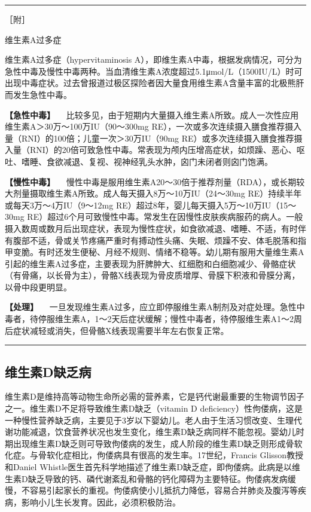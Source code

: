 \begin{center}\rule{0.5\linewidth}{\linethickness}\end{center}

［附］

维生素A过多症

维生素A过多症（hypervitaminosis
A），即维生素A中毒，根据发病情况，可分为急性中毒及慢性中毒两种。当血清维生素A浓度超过5.1μmol/L（1500IU/L）时可出现中毒症状。过去曾报道过极区探险者因大量食用维生素A含量丰富的北极熊肝而发生急性中毒。

\textbf{【急性中毒】}
　比较多见，由于短期内大量摄入维生素A所致。成人一次性应用维生素A＞30万～100万IU（90～300mg
RE），一次或多次连续摄入膳食推荐摄入量（RNI）的100倍；儿童一次＞30万IU（90mg
RE）或多次连续摄入膳食推荐摄入量（RNI）的20倍可致急性中毒。常表现为颅内压增高症状，如烦躁、恶心、呕吐、嗜睡、食欲减退、复视、视神经乳头水肿，囟门未闭者则囟门饱满。

\textbf{【慢性中毒】}
　慢性中毒是服用维生素A20～30倍于推荐剂量（RDA），或长期较大剂量摄取维生素A所致。成人每天摄入8万～10万IU（24～30mg
RE）持续半年或每天3万～4万IU（9～12mg
RE）超过8年，婴儿每天摄入5万～10万IU（15～30mg
RE）超过6个月可致慢性中毒。常发生在因慢性皮肤疾病服药的病人。一般摄入数周或数月后出现症状，表现为慢性症状，如食欲减退、嗜睡、不适，有时伴有腹部不适，骨或关节疼痛严重时有搏动性头痛、失眠、烦躁不安、体毛脱落和指甲变脆。有时还发生便秘、月经不规则、情绪不稳等。幼儿期有服用大量维生素A引起的维生素A过多症，主要表现为肝脾肿大、红细胞和白细胞减少、骨骼症状（有骨痛，以长骨为主），骨骼X线表现为骨皮质增厚、骨膜下积液和骨膜分离，以骨中段更明显。

\textbf{【处理】}
　一旦发现维生素A过多，应立即停服维生素A制剂及对症处理。急性中毒者，待停服维生素A，1～2天后症状缓解；慢性中毒者，待停服维生素A1～2周后症状减轻或消失，但骨骼X线表现需要半年左右恢复正常。

\begin{center}\rule{0.5\linewidth}{\linethickness}\end{center}

\hypertarget{text00003.htmlux5cux23mllj18}{%
\subsection{维生素D缺乏病}\label{text00003.htmlux5cux23mllj18}}

维生素D是维持高等动物生命所必需的营养素，它是钙代谢最重要的生物调节因子之一。维生素D不足将导致维生素D缺乏（vitamin
D
deficiency）性佝偻病，这是一种慢性营养缺乏病，主要见于3岁以下婴幼儿。老人由于生活习惯改变、生理代谢功能减退，饮食营养状况也发生变化，维生素D缺乏病同样不能忽视。婴幼儿时期出现维生素D缺乏则可导致佝偻病的发生，成人阶段的维生素D缺乏则形成骨软化症。与骨软化症相比，佝偻病具有很高的发生率。17世纪，Francis
Glisson教授和Daniel
Whistle医生首先科学地描述了维生素D缺乏症，即佝偻病。此病是以维生素D缺乏导致的钙、磷代谢紊乱和骨骼的钙化障碍为主要特征。佝偻病发病缓慢，不容易引起家长的重视。佝偻病使小儿抵抗力降低，容易合并肺炎及腹泻等疾病，影响小儿生长发育。因此，必须积极防治。

